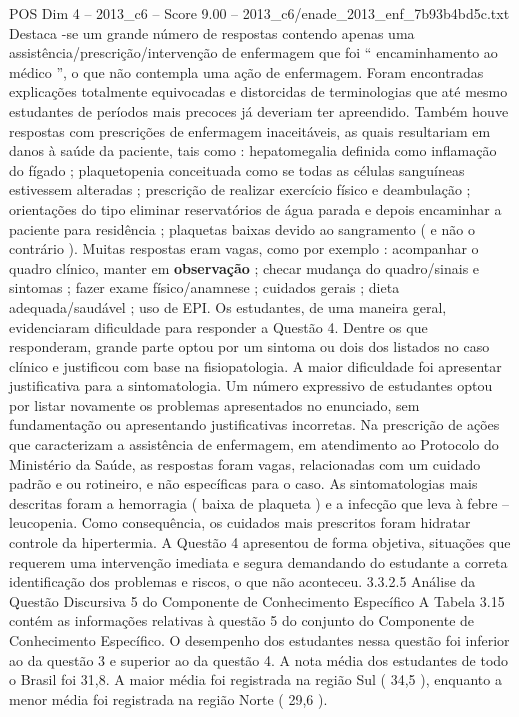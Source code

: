 \begin{textsample}{POS Dim 4 – 2013\_c6 – Score 9.00 – 2013\_c6/enade\_2013\_enf\_7b93b4bd5c.txt}
Destaca -se um grande número de respostas contendo apenas uma assistência/prescrição/intervenção de enfermagem que foi “ encaminhamento ao médico ”, o que não contempla uma ação de enfermagem.
Foram encontradas explicações totalmente equivocadas e distorcidas de terminologias que até mesmo estudantes de períodos mais precoces já deveriam ter apreendido.
Também houve respostas com prescrições de enfermagem inaceitáveis, as quais resultariam em danos à saúde da paciente, tais como : hepatomegalia definida como inflamação do fígado ; plaquetopenia conceituada como se todas as células sanguíneas estivessem alteradas ; prescrição de realizar exercício físico e deambulação ; orientações do tipo eliminar reservatórios de água parada e depois encaminhar a paciente para residência ; plaquetas baixas devido ao sangramento ( e não o contrário ).
Muitas respostas eram vagas, como por exemplo : acompanhar o quadro clínico, manter em \textbf{observação} ; checar mudança do quadro/sinais e sintomas ; fazer exame físico/anamnese ; cuidados gerais ; dieta adequada/saudável ; uso de EPI.
Os estudantes, de uma maneira geral, evidenciaram dificuldade para responder a Questão 4.
Dentre os que responderam, grande parte optou por um sintoma ou dois dos listados no caso clínico e justificou com base na fisiopatologia.
A maior dificuldade foi apresentar justificativa para a sintomatologia.
Um número expressivo de estudantes optou por listar novamente os problemas apresentados no enunciado, sem fundamentação ou apresentando justificativas incorretas.
Na prescrição de ações que caracterizam a assistência de enfermagem, em atendimento ao Protocolo do Ministério da Saúde, as respostas foram vagas, relacionadas com um cuidado padrão e ou rotineiro, e não específicas para o caso.
As sintomatologias mais descritas foram a hemorragia ( baixa de plaqueta ) e a infecção que leva à febre – leucopenia.
Como consequência, os cuidados mais prescritos foram hidratar controle da hipertermia.
A Questão 4 apresentou de forma objetiva, situações que requerem uma intervenção imediata e segura demandando do estudante a correta identificação dos problemas e riscos, o que não aconteceu. 3.3.2.5 Análise da Questão Discursiva 5 do Componente de Conhecimento Específico A Tabela 3.15 contém as informações relativas à questão 5 do conjunto do Componente de Conhecimento Específico.
O desempenho dos estudantes nessa questão foi inferior ao da questão 3 e superior ao da questão 4.
A nota média dos estudantes de todo o Brasil foi 31,8.
A maior média foi registrada na região Sul ( 34,5 ), enquanto a menor média foi registrada na região Norte ( 29,6 ).

\end{textsample}
